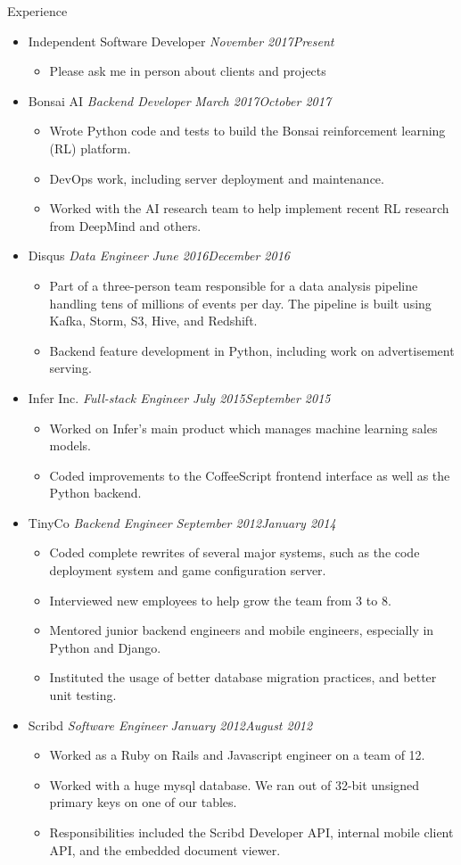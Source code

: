 \documentclass[11pt,oneside]{article}
\newenvironment{ressection}[1]{
    \textrm{\Large#1}
    \begin{itemize}
}{
    \end{itemize}
}
\newcommand{\ressubitem}[1]{
    \item \begin{flushleft} \textsf{#1} \end{flushleft}
}
\newcommand{\resbigitem}[3]{
    \item
    \textrm{#1}
    \hspace{5pt}
    \textit{#2}
    \hfill
    \textit{#3}
}
\newenvironment{ressubsec}[3]{
    \resbigitem{#1}{#2}{#3}
    \begin{itemize}
}{
    \end{itemize}
}
\begin{document}
\begin{ressection}{Experience}

    \begin{ressubsec}{Independent Software Developer}{}{November 2017\textendash Present}
        \ressubitem{Please ask me in person about clients and projects}
    \end{ressubsec}

    \begin{ressubsec}{Bonsai AI}{Backend Developer}{March 2017\textendash October 2017}
        \ressubitem{Wrote Python code and tests to build the Bonsai reinforcement learning (RL) platform.}
        \ressubitem{DevOps work, including server deployment and maintenance.}
        \ressubitem{Worked with the AI research team to help implement recent RL research from DeepMind and others.}
    \end{ressubsec}

    \begin{ressubsec}{Disqus}{Data Engineer}{June 2016\textendash December 2016}
        \ressubitem{Part of a three-person team responsible for a data analysis pipeline handling tens of millions of events per day. The pipeline is built using Kafka, Storm, S3, Hive, and Redshift.}
        \ressubitem{Backend feature development in Python, including work on advertisement serving.}
    \end{ressubsec}

    \begin{ressubsec}{Infer Inc.}{Full-stack Engineer}{July 2015\textendash September 2015}
        \ressubitem{Worked on Infer's main product which manages machine learning sales models.}
        \ressubitem{Coded improvements to the CoffeeScript frontend interface as well as the Python backend.}
    \end{ressubsec}

    \begin{ressubsec}{TinyCo}{Backend Engineer}{September 2012\textendash January 2014}
        \ressubitem{Coded complete rewrites of several major systems, such as the code deployment system and game configuration server.}
        \ressubitem{Interviewed new employees to help grow the team from 3 to 8.}
        \ressubitem{Mentored junior backend engineers and mobile engineers, especially in Python and Django.}
        \ressubitem{Instituted the usage of better database migration practices, and better unit testing.}
    \end{ressubsec}

    \begin{ressubsec}{Scribd}{Software Engineer}{January 2012\textendash August 2012}
        \ressubitem{Worked as a Ruby on Rails and Javascript engineer on a team of 12.}
        \ressubitem{Worked with a huge mysql database. We ran out of 32-bit unsigned primary keys on one of our tables.}
        \ressubitem{Responsibilities included the Scribd Developer API, internal mobile client API, and the embedded document viewer.}
    \end{ressubsec}


\end{ressection}
\end{document}
